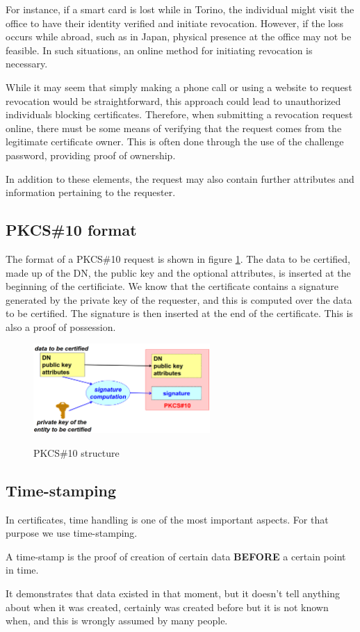 For instance, if a smart card is lost while in Torino, the individual
might visit the office to have their identity verified and initiate
revocation. However, if the loss occurs while abroad, such as in Japan,
physical presence at the office may not be feasible. In such
situations, an online method for initiating revocation is necessary.

While it may seem that simply making a phone call or using a website to
request revocation would be straightforward, this approach could lead
to unauthorized individuals blocking certificates. Therefore, when
submitting a revocation request online, there must be some means of
verifying that the request comes from the legitimate certificate owner.
This is often done through the use of the challenge password, providing
proof of ownership.

In addition to these elements, the request may also contain further
attributes and information pertaining to the requester.

\subsection{PKCS\#10 format}
The format of a PKCS\#10 request is shown in figure 
\ref{fig:PKCS10 structure}. The data to be certified, made up of the
DN, the public key and the optional attributes, is inserted at the
beginning of the certificiate. We know that the certificate contains a
signature generated by the private key of the requester, and this is
computed over the data to be certified. The signature is then inserted
at the end of the certificate. This is also a proof of possession.

\begin{figure}[H]
  \centering
  \includegraphics[width=0.6\textwidth]{img/x509 pkcs request.png}
  \label{fig:PKCS10 structure}

  \caption{PKCS\#10 structure}
\end{figure}

\subsection{Time-stamping}
In certificates, time handling is one of the most important aspects.
For that purpose we use time-stamping.
\begin{boxH}
  A time-stamp is the proof of creation of certain data
  \textbf{BEFORE} a certain point in time.
\end{boxH}
It demonstrates that data existed in that moment, but it doesn’t tell
anything about when it was created, certainly was created before but
it is not known when, and this is wrongly assumed by many people.

